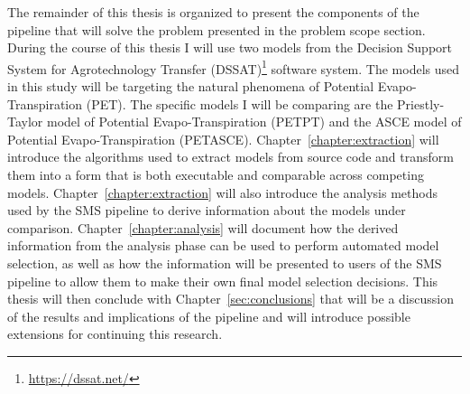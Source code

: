 The remainder of this thesis is organized to present the components of the pipeline that will solve the problem presented in the problem scope section.
During the course of this thesis I will use two models from the Decision Support System for Agrotechnology Transfer (DSSAT)\footnote{\url{https://dssat.net/}}
software system.
The models used in this study will be targeting the natural phenomena of Potential Evapo-Transpiration (PET).
The specific models I will be comparing are the Priestly-Taylor model of Potential Evapo-Transpiration (PETPT) and the ASCE model of Potential Evapo-Transpiration (PETASCE).
Chapter~\ref{chapter:extraction} will introduce the algorithms used to extract models from source code and transform them into a form that is both executable and comparable across competing models.
Chapter~\ref{chapter:extraction} will also introduce the analysis methods used by the SMS pipeline to derive information about the models under comparison.
Chapter~\ref{chapter:analysis} will document how the derived information from the analysis phase can be used to perform automated model selection, as well as how the information will be presented to users of the SMS pipeline to allow them to make their own final model selection decisions.
This thesis will then conclude with Chapter~\ref{sec:conclusions} that will be a discussion of the results and implications of the pipeline and will introduce possible extensions for continuing this research.

